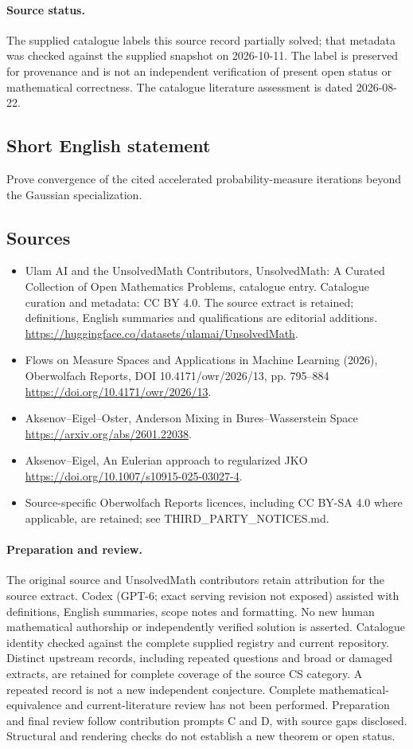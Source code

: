 \documentclass[11pt]{article}
\begin{document}
\paragraph{Source status.}
The supplied catalogue labels this source record partially solved; that metadata was checked against the supplied snapshot on 2026-10-11. The label is preserved for provenance and is not an independent verification of present open status or mathematical correctness. The catalogue literature assessment is dated 2026-08-22.
\subsection{Short English statement}
Prove convergence of the cited accelerated probability-measure iterations beyond the Gaussian specialization.
\subsection{Sources}
\begin{itemize}
\item[S1] Ulam AI and the UnsolvedMath Contributors, UnsolvedMath: A Curated Collection of Open Mathematics Problems, catalogue entry. Catalogue curation and metadata: CC BY 4.0. The source extract is retained; definitions, English summaries and qualifications are editorial additions.
\url{https://huggingface.co/datasets/ulamai/UnsolvedMath}.
\item[S2] Flows on Measure Spaces and Applications in Machine Learning (2026), Oberwolfach Reports, DOI 10.4171/owr/2026/13, pp. 795--884
\url{https://doi.org/10.4171/owr/2026/13}.
\item[S3] Aksenov--Eigel--Oster, Anderson Mixing in Bures--Wasserstein Space
\url{https://arxiv.org/abs/2601.22038}.
\item[S4] Aksenov--Eigel, An Eulerian approach to regularized JKO
\url{https://doi.org/10.1007/s10915-025-03027-4}.
\item Source-specific Oberwolfach Reports licences, including CC BY-SA 4.0 where applicable, are retained; see THIRD\_PARTY\_NOTICES.md.
\end{itemize}
\paragraph{Preparation and review.}
The original source and UnsolvedMath contributors retain attribution for the source extract. Codex (GPT-6; exact serving revision not exposed) assisted with definitions, English summaries, scope notes and formatting. No new human mathematical authorship or independently verified solution is asserted. Catalogue identity checked against the complete supplied registry and current repository. Distinct upstream records, including repeated questions and broad or damaged extracts, are retained for complete coverage of the source CS category. A repeated record is not a new independent conjecture. Complete mathematical-equivalence and current-literature review has not been performed. Preparation and final review follow contribution prompts C and D, with source gaps disclosed. Structural and rendering checks do not establish a new theorem or open status.
\label{end:statement}
\end{document}
